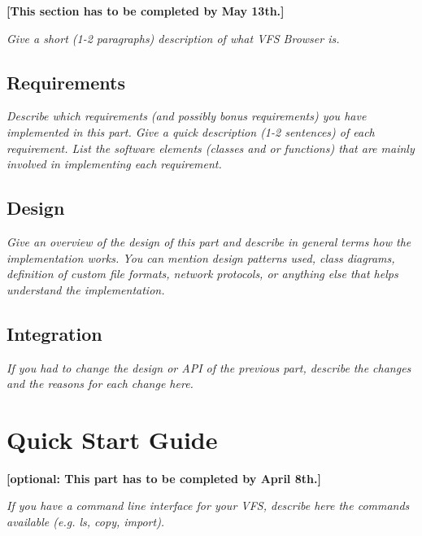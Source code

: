 \documentclass[a4paper,12pt]{article}
\begin{document}
\textbf{[This section has to be completed by May 13th.]}

\emph{Give a short (1-2 paragraphs) description of what VFS Browser is.}


\subsection{Requirements}

\emph{Describe which requirements (and possibly bonus requirements) you have implemented in this part. Give a quick description (1-2 sentences) of each requirement. List the software elements (classes and or functions) that are mainly involved in implementing each requirement.}


\subsection{Design}

\emph{Give an overview of the design of this part and describe in general terms how the implementation works. You can mention design patterns used, class diagrams, definition of custom file formats, network protocols, or anything else that helps understand the implementation.}


\subsection{Integration}

\emph{If you had to change the design or API of the previous part, describe the changes and the reasons for each change here.}




\section{Quick Start Guide}

\textbf{[optional: This part has to be completed by April 8th.]}

\emph{If you have a command line interface for your VFS, describe here the commands available (e.g. ls, copy, import).} \\ \\ \\
\end{document}
